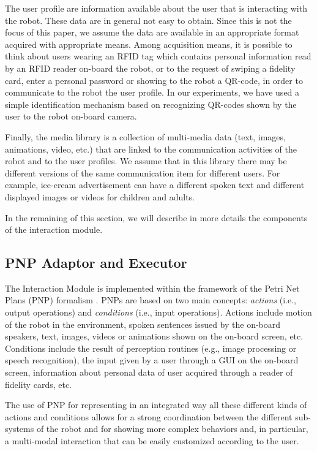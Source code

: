 The user profile are information available about the user that is interacting with the robot. These data are in general not easy to obtain. Since this is not the focus of this paper, we assume the data are available in an appropriate format acquired with appropriate means.
Among acquisition means, it is possible to think about users wearing an RFID tag which contains personal information read by an RFID reader on-board the robot, or to the request of swiping a fidelity card, enter a personal password or showing to the robot a QR-code, in order to communicate to the robot the user profile.
In our experiments, we have used a simple identification mechanism based on recognizing QR-codes shown by the user to the robot on-board camera.

Finally, the media library is a collection of multi-media data (text, images, animations, video, etc.) that are linked to the communication activities of the robot and to the user profiles. We assume that in this library there may be different versions of the same communication item for different users. For example, ice-cream advertisement can have a different spoken text and different displayed images or videos for children and adults.

In the remaining of this section, we will describe in more details the components of the interaction module.

\subsection{PNP Adaptor and Executor}

The Interaction Module is implemented within the framework of the Petri Net Plans (PNP) formalism \cite{ZiIo}. PNPs are based on two main concepts: \emph{actions} (i.e., output operations) and \emph{conditions} (i.e., input operations). Actions include motion of the robot in the environment, spoken sentences issued by the on-board speakers, text, images, videos or animations shown on the on-board screen, etc.
Conditions include the result of perception routines (e.g., image processing or speech recognition), the input given by a user through a GUI on the on-board screen, information about personal data of user acquired through a reader of fidelity cards, etc.

The use of PNP for representing in an integrated way all these different kinds of actions and conditions allows for a strong coordination between the different sub-systems of the robot and for showing more complex behaviors and, in particular, a multi-modal interaction that can be easily customized according to the user.


